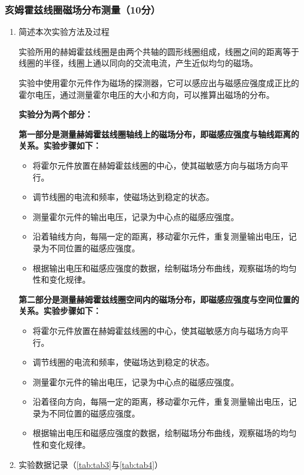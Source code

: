 \documentclass[dvipsnames, svgnames,a4paper,11pt]{article}
\begin{document}
	\subsubsection{亥姆霍兹线圈磁场分布测量（10分）}
	\begin{enumerate}
		\item 简述本次实验方法及过程
		
		实验所用的赫姆霍兹线圈是由两个共轴的圆形线圈组成，线圈之间的距离等于线圈的半径，线圈上通以同向的交流电流，产生近似均匀的磁场。
		
		实验中使用霍尔元件作为磁场的探测器，它可以感应出与磁感应强度成正比的霍尔电压，通过测量霍尔电压的大小和方向，可以推算出磁场的分布。
		
		\textbf{实验分为两个部分：}
		
		\textbf{第一部分是测量赫姆霍兹线圈轴线上的磁场分布，即磁感应强度与轴线距离的关系。实验步骤如下：}
		\begin{itemize}
			\item 将霍尔元件放置在赫姆霍兹线圈的中心，使其磁敏感方向与磁场方向平行。
			\item 调节线圈的电流和频率，使磁场达到稳定的状态。
			\item 测量霍尔元件的输出电压，记录为中心点的磁感应强度。
			\item 沿着轴线方向，每隔一定的距离，移动霍尔元件，重复测量输出电压，记录为不同位置的磁感应强度。
			\item 根据输出电压和磁感应强度的数据，绘制磁场分布曲线，观察磁场的均匀性和变化规律。
		\end{itemize}
		
		\textbf{第二部分是测量赫姆霍兹线圈空间内的磁场分布，即磁感应强度与空间位置的关系。实验步骤如下：}
		\begin{itemize}
			\item 将霍尔元件放置在赫姆霍兹线圈的中心，使其磁敏感方向与磁场方向平行。
			\item 调节线圈的电流和频率，使磁场达到稳定的状态。
			\item 测量霍尔元件的输出电压，记录为中心点的磁感应强度。
			\item 沿着径向方向，每隔一定的距离，移动霍尔元件，重复测量输出电压，记录为不同位置的磁感应强度。
			\item 根据输出电压和磁感应强度的数据，绘制磁场分布曲线，观察磁场的均匀性和变化规律。
		\end{itemize}
				
		\item 实验数据记录（\cref{tab:tab3}与\cref{tab:tab4}）
		

\end{enumerate}
\end{document}
